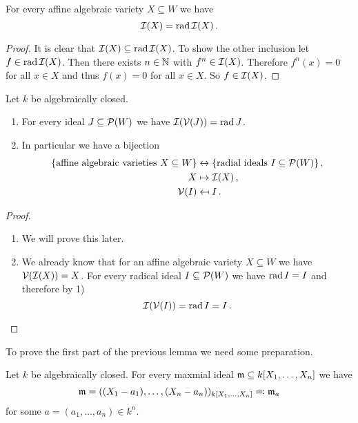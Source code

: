\begin{lemma}
  For every affine algebraic variety $X \subseteq W$ we have
  \[
    \mathcal{I}(X)
  = \operatorname{rad} \mathcal{I}(X) \,.
  \]
\end{lemma}
\begin{proof}
  It is clear that $\mathcal{I}(X) \subseteq \operatorname{rad} \mathcal{I}(X)$.
  To show the other inclusion let \mbox{$f \in \operatorname{rad} \mathcal{I}(X)$}.
  Then there exists $n \in \mathbb{N}$ with $f^n \in \mathcal{I}(X)$.
  Therefore $f^n(x) = 0$ for all $x \in X$ and thus $f(x) = 0$ for all $x \in X$.
  So $f \in \mathcal{I}(X)$.
\end{proof}


\begin{proposition}
  Let $k$ be algebraically closed.
  \begin{enumerate}[label=\emph{\alph*)},leftmargin=*]
    \item
      For every ideal $J \subseteq \mathcal{P}(W)$ we have $\mathcal{I}(\mathcal{V}(J)) = \operatorname{rad} J$.
    \item
      In particular we have a bijection
      \begin{align*}
                          \{\text{affine algebraic varieties $X \subseteq W$}\}
        &\leftrightarrow  \{\text{radial ideals $I \subseteq \mathcal{P}(W)$}\} \,,  \\
                          X
        &\mapsto          \mathcal{I}(X) \,, \\
                          \mathcal{V}(I)
        &\mapsfrom        I \,.
    \end{align*}
  \end{enumerate}
\end{proposition}
\begin{proof}
  \begin{enumerate}[label=\emph{\alph*)},leftmargin=*]
    \item
      We will prove this later.
    \item
      We already know that for an affine algebraic variety $X \subseteq W$ we have $\mathcal{V}(\mathcal{I}(X)) = X$.
      For every radical ideal $I \subseteq \mathcal{P}(W)$ we have $\operatorname{rad} I = I$ and therefore by 1)
      \[
          \mathcal{I}(\mathcal{V}(I))
        = \operatorname{rad} I
        = I \,.
        \qedhere
      \]
  \end{enumerate}
\end{proof}


To prove the first part of the previous lemma we need some preparation.


\begin{theorem}
  Let $k$ be algebraically closed.
  For every maxmial ideal \mbox{$\mathfrak{m} \subseteq k[X_1, \dotsc, X_n]$} we have
  \[
              \mathfrak{m}
    =         ( (X_1 - a_1), \dotsc, (X_n - a_n) )_{k[X_1, \dotsc, X_n]}
    \eqqcolon \mathfrak{m}_a
  \]
  for some $a = (a_1, \dotsc, a_n) \in k^n$.
\end{theorem}


